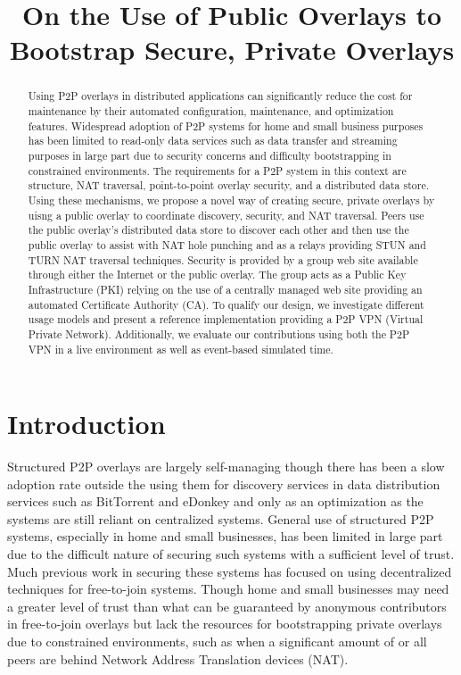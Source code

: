 \documentclass[conference]{IEEEtran}
\begin{document}
\title{On the Use of Public Overlays to Bootstrap Secure, Private Overlays}

\author{ 
}

\maketitle

\begin{abstract}
Using P2P overlays in distributed applications can significantly reduce the
cost for maintenance by their automated configuration, maintenance, and
optimization features.  Widespread adoption of P2P systems for home and small
business purposes has been limited to read-only data services such as data
transfer and streaming purposes in large part due to security concerns and
difficulty bootstrapping in constrained environments.  The requirements for
a P2P system in this context are structure, NAT traversal, point-to-point overlay
security, and a distributed data store.  Using these mechanisms, we propose
a novel way of creating secure, private overlays by uisng a public overlay
to coordinate discovery, security, and NAT traversal.  Peers use the public
overlay's distributed data store to discover each other and then use the
public overlay to assist with NAT hole punching and as a relays providing STUN
and TURN NAT traversal techniques.  Security is provided by a group web site
available through either the Internet or the public overlay.  The group acts
as a Public Key Infrastructure (PKI) relying on the use of a centrally
managed web site providing an automated Certificate Authority (CA).  To
qualify our design, we investigate different usage models and present a
reference implementation providing a P2P VPN (Virtual Private Network).
Additionally, we evaluate our contributions using both the P2P VPN in a live
environment as well as event-based simulated time.
\end{abstract}
\section{Introduction}
Structured P2P overlays are largely self-managing though there has been a slow
adoption rate outside the using them for discovery services in data distribution
services such as BitTorrent and eDonkey and only as an optimization as the
systems are still reliant on centralized systems.  General use of structured
P2P systems, especially in home and small businesses, has been limited in large
part due to the difficult nature of securing such systems with a sufficient level
of trust.  Much previous work in securing these systems has focused on using
decentralized techniques for free-to-join systems.  Though home and small
businesses may need a greater level of trust than what can be guaranteed by
anonymous contributors in free-to-join overlays but lack the resources for
bootstrapping private overlays due to constrained environments, such as when a
significant amount of or all peers are behind Network Address Translation
devices (NAT).
\end{document}
